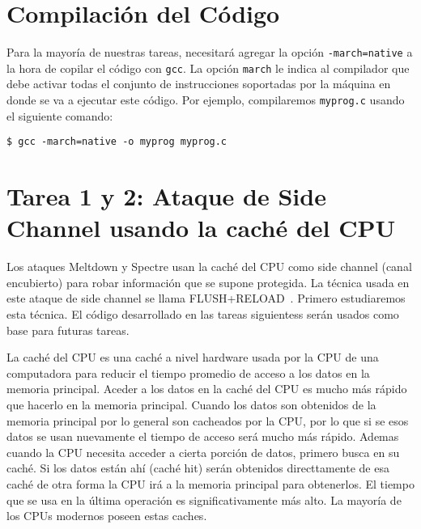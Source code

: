 
\section{Compilación del Código}
\label{sidechannel:sec:compilation}

Para la mayoría de nuestras tareas, necesitará agregar la opción \texttt{-march=native} a la hora de copilar el código con \texttt{gcc}. La opción \texttt{march} le indica al compilador que debe activar todas el conjunto de  instrucciones soportadas por la máquina en donde se va a ejecutar este código.
Por ejemplo, compilaremos \texttt{myprog.c} usando el siguiente comando:

\begin{lstlisting}
$ gcc -march=native -o myprog myprog.c
\end{lstlisting}



\section{Tarea 1 y 2: Ataque de Side Channel usando la caché del CPU}

Los ataques Meltdown y Spectre usan la caché del CPU como side channel (canal encubierto) para robar información que se supone protegida. La técnica usada en este ataque de side channel se llama FLUSH+RELOAD~\cite{Yarom2014}. 
Primero estudiaremos esta técnica. El código desarrollado en las tareas siguientess serán usados como base para futuras tareas.

La caché del CPU es una caché a nivel hardware usada por la CPU de una computadora para reducir el tiempo promedio de acceso a los datos en la memoria principal. Aceder a los datos en la caché del CPU es mucho más rápido que hacerlo en la memoria principal. Cuando los datos son obtenidos de la memoria principal por lo general son cacheados por la CPU, por lo que si se esos datos se usan nuevamente el tiempo de acceso será mucho más rápido. Ademas cuando la CPU necesita acceder a cierta porción de datos, primero busca en su caché. Si los datos están ahí (caché hit) serán obtenidos directtamente de esa caché de otra forma la CPU irá a la memoria principal para obtenerlos. El tiempo que se usa en la última operación es significativamente más alto. La mayoría de los CPUs modernos poseen estas caches.


